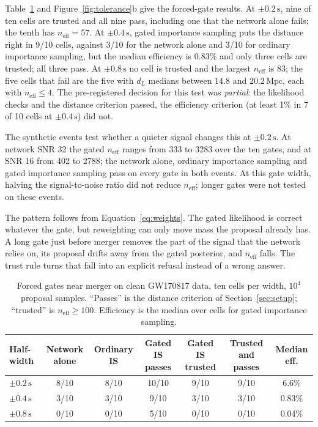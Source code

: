 \documentclass{openjournal}
\newcommand{\dL}{d_L}
\newcommand{\neff}{n_{\mathrm{eff}}}
\begin{document}
Table~\ref{tab:forced} and Figure~\ref{fig:tolerance}b give the forced-gate results.
At $\pm0.2\,\mathrm{s}$, nine of ten cells are trusted and all nine pass, including one that the network alone fails; the tenth has $\neff=57$.
At $\pm0.4\,\mathrm{s}$, gated importance sampling puts the distance right in 9/10 cells, against 3/10 for the network alone and 3/10 for ordinary importance sampling, but the median efficiency is 0.83\% and only three cells are trusted; all three pass.
At $\pm0.8\,\mathrm{s}$ no cell is trusted and the largest $\neff$ is 83; the five cells that fail are the five with $\dL$ medians between $14.8$ and $20.2\,\mathrm{Mpc}$, each with $\neff\le4$.
The pre-registered decision for this test was \emph{partial}: the likelihood checks and the distance criterion passed, the efficiency criterion (at least 1\% in 7 of 10 cells at $\pm0.4\,\mathrm{s}$) did not.

The synthetic events test whether a quieter signal changes this at $\pm0.2\,\mathrm{s}$.
At network SNR 32 the gated $\neff$ ranges from 333 to 3283 over the ten gates, and at SNR 16 from 402 to 2788; the network alone, ordinary importance sampling and gated importance sampling pass on every gate in both events.
At this gate width, halving the signal-to-noise ratio did not reduce $\neff$; longer gates were not tested on these events.

The pattern follows from Equation~\eqref{eq:weights}.
The gated likelihood is correct whatever the gate, but reweighting can only move mass the proposal already has.
A long gate just before merger removes the part of the signal that the network relies on, its proposal drifts away from the gated posterior, and $\neff$ falls.
The trust rule turns that fall into an explicit refusal instead of a wrong answer.

\begin{table}[t]
\centering
\caption{Forced gates near merger on clean GW170817 data, ten cells per width, $10^{4}$ proposal samples.
``Passes'' is the distance criterion of Section~\ref{sec:setup}; ``trusted'' is $\neff\ge100$.
Efficiency is the median over cells for gated importance sampling.}
\label{tab:forced}
\footnotesize
\setlength{\tabcolsep}{4pt}
\begin{tabular}{@{}lcccccc@{}}
\toprule
Half-width & Network alone & Ordinary IS & Gated IS passes & Gated IS trusted & Trusted and passes & Median eff.\\
\midrule
$\pm0.2\,\mathrm{s}$ & 8/10 & 8/10 & 10/10 & 9/10 & 9/10 & 6.6\% \\
$\pm0.4\,\mathrm{s}$ & 3/10 & 3/10 & 9/10 & 3/10 & 3/10 & 0.83\% \\
$\pm0.8\,\mathrm{s}$ & 0/10 & 0/10 & 5/10 & 0/10 & 0/10 & 0.04\% \\
\bottomrule
\end{tabular}
\end{table}
\end{document}
